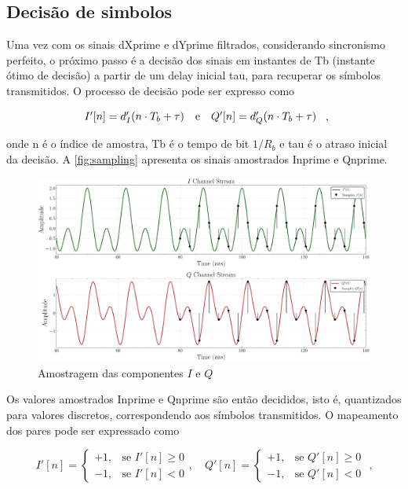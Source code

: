 \subsection{Decisão de simbolos}

Uma vez com os sinais \gls{dXprime} e \gls{dYprime} filtrados, considerando sincronismo perfeito, o próximo passo é a decisão dos sinais em instantes de \gls{Tb} (instante ótimo de decisão) a partir de um delay inicial \gls{tau}, para recuperar os símbolos transmitidos. O processo de decisão pode ser expresso como

\vspace{-1em}
\begin{equation}
    \begin{array}{c@{\quad\text{e}\quad}c}
        I'[n] = d'_I(n \cdot T_b + \tau) & Q'[n] = d'_Q(n \cdot T_b + \tau)
    \end{array} \text{ ,}
\end{equation}

\noindent onde \gls{n} é o índice de amostra, \gls{Tb} é o tempo de bit $1/R_b$ e \gls{tau} é o atraso inicial da decisão. A \autoref{fig:sampling} apresenta os sinais amostrados \gls{Inprime} e \gls{Qnprime}. 

\begin{figure}[H]
	\centering
	\caption{Amostragem das componentes $I$ e $Q$}\label{fig:sampling}
	\includegraphics[width=\linewidth]{assets/cap2/example_sampler_time.pdf}
    
\end{figure}

Os valores amostrados \gls{Inprime} e \gls{Qnprime} são então decididos, isto é, quantizados para valores discretos, correspondendo aos símbolos transmitidos. O mapeamento dos pares pode ser expressado como

\begin{equation} 
    I'[n] = \begin{cases}
    +1, & \text{se } I'[n] \geq 0 \\
    -1, & \text{se } I'[n] < 0
    \end{cases}, \quad
    Q'[n] = \begin{cases}
    +1, & \text{se } Q'[n] \geq 0 \\
    -1, & \text{se } Q'[n] < 0
    \end{cases} \text{ ,}
\end{equation}

